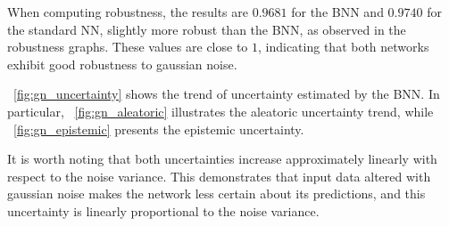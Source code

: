 When computing robustness, the results are $0.9681$ for the BNN and $0.9740$ for the standard NN, slightly more robust than the BNN, as observed in the robustness graphs. These values are close to $1$, indicating that both networks exhibit good robustness to gaussian noise.

\Fig~\ref{fig:gn_uncertainty} shows the trend of uncertainty estimated by the BNN. In particular, \Fig~\ref{fig:gn_aleatoric} illustrates the aleatoric uncertainty trend, while \Fig~\ref{fig:gn_epistemic} presents the epistemic uncertainty.

It is worth noting that both uncertainties increase approximately linearly with respect to the noise variance. This demonstrates that input data altered with gaussian noise makes the network less certain about its predictions, and this uncertainty is linearly proportional to the noise variance.

